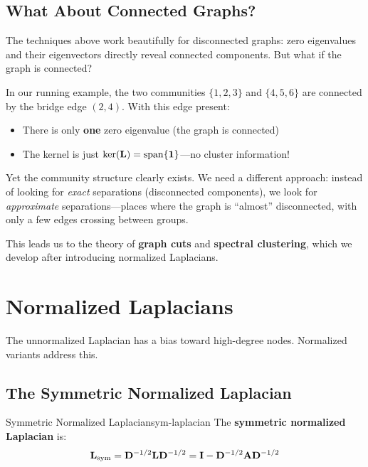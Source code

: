 \begin{notechapter}
\subsection{What About Connected Graphs?}

The techniques above work beautifully for disconnected graphs: zero eigenvalues and their eigenvectors directly reveal connected components. But what if the graph is connected?

\begin{intuition}
In our running example, the two communities $\{1, 2, 3\}$ and $\{4, 5, 6\}$ are connected by the bridge edge $(2, 4)$. With this edge present:
\begin{itemize}
    \item There is only \textbf{one} zero eigenvalue (the graph is connected)
    \item The kernel is just $\ker(\mathbf{L}) = \mathrm{span}\{\mathbf{1}\}$---no cluster information!
\end{itemize}

Yet the community structure clearly exists. We need a different approach: instead of looking for \textit{exact} separations (disconnected components), we look for \textit{approximate} separations---places where the graph is ``almost'' disconnected, with only a few edges crossing between groups.

This leads us to the theory of \textbf{graph cuts} and \textbf{spectral clustering}, which we develop after introducing normalized Laplacians.
\end{intuition}

\section{Normalized Laplacians}

The unnormalized Laplacian has a bias toward high-degree nodes. Normalized variants address this.

\subsection{The Symmetric Normalized Laplacian}

\begin{definition}{Symmetric Normalized Laplacian}{sym-laplacian}
The \textbf{symmetric normalized Laplacian} is:
\begin{equation}
\mathbf{L}_{\text{sym}} = \mathbf{D}^{-1/2} \mathbf{L} \mathbf{D}^{-1/2} = \mathbf{I} - \mathbf{D}^{-1/2} \mathbf{A} \mathbf{D}^{-1/2}
\label{graph-laplacians:eq:sym-laplacian}
\end{equation}
\end{definition}


\end{notechapter}

